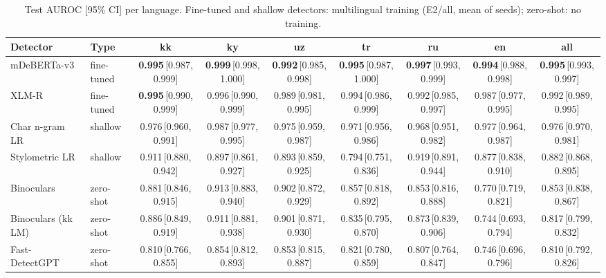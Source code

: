 \begin{table}[t]
\centering
\small
\caption{Test AUROC [95\% CI] per language. Fine-tuned and shallow detectors: multilingual training (E2/all, mean of seeds); zero-shot: no training.}
\label{tab:main}
\begin{tabular}{llccccccc}
\toprule
Detector & Type & kk & ky & uz & tr & ru & en & all \\
\midrule
mDeBERTa-v3 & fine-tuned & \textbf{0.995}\,{\scriptsize[0.987, 0.999]} & \textbf{0.999}\,{\scriptsize[0.998, 1.000]} & \textbf{0.992}\,{\scriptsize[0.985, 0.998]} & \textbf{0.995}\,{\scriptsize[0.987, 1.000]} & \textbf{0.997}\,{\scriptsize[0.993, 0.999]} & \textbf{0.994}\,{\scriptsize[0.988, 0.998]} & \textbf{0.995}\,{\scriptsize[0.993, 0.997]} \\
XLM-R & fine-tuned & \textbf{0.995}\,{\scriptsize[0.990, 0.999]} & 0.996\,{\scriptsize[0.990, 0.999]} & 0.989\,{\scriptsize[0.981, 0.995]} & 0.994\,{\scriptsize[0.986, 0.999]} & 0.992\,{\scriptsize[0.985, 0.997]} & 0.987\,{\scriptsize[0.977, 0.995]} & 0.992\,{\scriptsize[0.989, 0.995]} \\
Char n-gram LR & shallow & 0.976\,{\scriptsize[0.960, 0.991]} & 0.987\,{\scriptsize[0.977, 0.995]} & 0.975\,{\scriptsize[0.959, 0.987]} & 0.971\,{\scriptsize[0.956, 0.986]} & 0.968\,{\scriptsize[0.951, 0.982]} & 0.977\,{\scriptsize[0.964, 0.987]} & 0.976\,{\scriptsize[0.970, 0.981]} \\
Stylometric LR & shallow & 0.911\,{\scriptsize[0.880, 0.942]} & 0.897\,{\scriptsize[0.861, 0.927]} & 0.893\,{\scriptsize[0.859, 0.925]} & 0.794\,{\scriptsize[0.751, 0.836]} & 0.919\,{\scriptsize[0.891, 0.944]} & 0.877\,{\scriptsize[0.838, 0.910]} & 0.882\,{\scriptsize[0.868, 0.895]} \\
Binoculars & zero-shot & 0.881\,{\scriptsize[0.846, 0.915]} & 0.913\,{\scriptsize[0.883, 0.940]} & 0.902\,{\scriptsize[0.872, 0.929]} & 0.857\,{\scriptsize[0.818, 0.892]} & 0.853\,{\scriptsize[0.816, 0.888]} & 0.770\,{\scriptsize[0.719, 0.821]} & 0.853\,{\scriptsize[0.838, 0.867]} \\
Binoculars (kk LM) & zero-shot & 0.886\,{\scriptsize[0.849, 0.919]} & 0.911\,{\scriptsize[0.881, 0.938]} & 0.901\,{\scriptsize[0.871, 0.930]} & 0.835\,{\scriptsize[0.795, 0.870]} & 0.873\,{\scriptsize[0.839, 0.906]} & 0.744\,{\scriptsize[0.693, 0.794]} & 0.817\,{\scriptsize[0.799, 0.832]} \\
Fast-DetectGPT & zero-shot & 0.810\,{\scriptsize[0.766, 0.855]} & 0.854\,{\scriptsize[0.812, 0.893]} & 0.853\,{\scriptsize[0.815, 0.887]} & 0.821\,{\scriptsize[0.780, 0.859]} & 0.807\,{\scriptsize[0.764, 0.847]} & 0.746\,{\scriptsize[0.696, 0.796]} & 0.810\,{\scriptsize[0.792, 0.826]} \\

\end{tabular}
\end{table}
